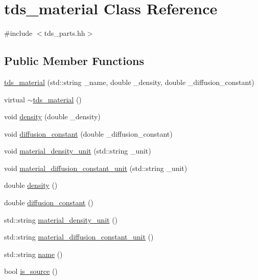 \hypertarget{classtds__material}{}\section{tds\+\_\+material Class Reference}
\label{classtds__material}


{\ttfamily \#include $<$tds\+\_\+parts.\+hh$>$}

\subsection*{Public Member Functions}
\begin{DoxyCompactItemize}
\item 
\hyperlink{classtds__material_af5fb49cd6a56b7eec0bd5c534327c987}{tds\+\_\+material} (std\+::string \+\_\+name, double \+\_\+density, double \+\_\+diffusion\+\_\+constant)
\item 
virtual \hyperlink{classtds__material_ad81f9ebe4bf33e2443479827f7d05b61}{$\sim$tds\+\_\+material} ()
\item 
void \hyperlink{classtds__material_ae1daf38db1671338e414dea7fa97b9f5}{density} (double \+\_\+density)
\item 
void \hyperlink{classtds__material_a26af9e8081aa8bde0fc2eac50b2b6c84}{diffusion\+\_\+constant} (double \+\_\+diffusion\+\_\+constant)
\item 
void \hyperlink{classtds__material_ad3875511cdb690c12fda10b1c8633b61}{material\+\_\+density\+\_\+unit} (std\+::string \+\_\+unit)
\item 
void \hyperlink{classtds__material_a58e27f901a1e39920282b8eb717a26b3}{material\+\_\+diffusion\+\_\+constant\+\_\+unit} (std\+::string \+\_\+unit)
\item 
double \hyperlink{classtds__material_a43ff0d801d23708b91d8ba1dfecb2c42}{density} ()
\item 
double \hyperlink{classtds__material_a8110986dcbebd04a3e80fb8f5eb3d6db}{diffusion\+\_\+constant} ()
\item 
std\+::string \hyperlink{classtds__material_a15016461ba5979216d18999ee7f5095c}{material\+\_\+density\+\_\+unit} ()
\item 
std\+::string \hyperlink{classtds__material_aeba2d3922cb11dc35d21c8951cf8e42e}{material\+\_\+diffusion\+\_\+constant\+\_\+unit} ()
\item 
std\+::string \hyperlink{classtds__material_ab47ac26347c2abeba02060b33db00eeb}{name} ()
\item 
bool \hyperlink{classtds__material_ae35dd97014996e55189b7a0477653639}{is\+\_\+source} ()
\end{DoxyCompactItemize}


